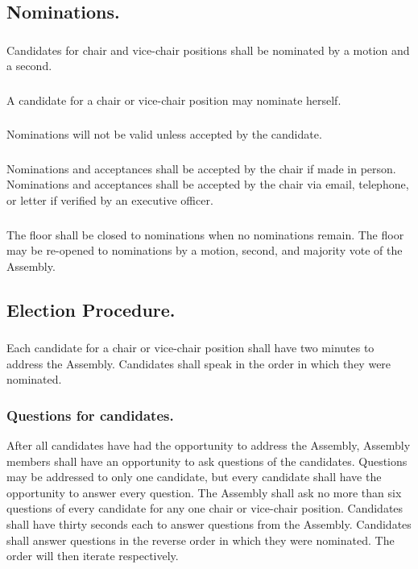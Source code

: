 \documentclass{rules}
\begin{document}
\subsection{Nominations.}
\subsubsection{}
Candidates for chair and vice-chair positions shall be nominated by a motion and a second.
\subsubsection{}
A candidate for a chair or vice-chair position may nominate herself.
\subsubsection{}
Nominations will not be valid unless accepted by the candidate. 
\subsubsection{}
Nominations and acceptances shall be accepted by the chair if made in person.  Nominations and acceptances shall be accepted by the chair via email, telephone, or letter if verified by an executive officer.
\subsubsection{}
The floor shall be closed to nominations when no nominations remain.  The floor may be re-opened to nominations by a motion, second, and majority vote of the Assembly.
\subsection{Election Procedure.}
\subsubsection{}
Each candidate for a chair or vice-chair position shall have two minutes to address the Assembly.  Candidates shall speak in the order in which they were nominated.
\subsubsection{Questions for candidates.}
\subsubsubsection{}
After all candidates have had the opportunity to address the Assembly, Assembly members shall have an opportunity to ask questions of the candidates.
\subsubsubsection{}
Questions may be addressed to only one candidate, but every candidate shall have the opportunity to answer every question.
\subsubsubsection{}
The Assembly shall ask no more than six questions of every candidate for any one chair or vice-chair position.
\subsubsubsection{}
Candidates shall have thirty seconds each to answer questions from the Assembly.
\subsubsubsection{}
Candidates shall answer questions in the reverse order in which they were nominated.  The order will then iterate respectively.
\end{document}
